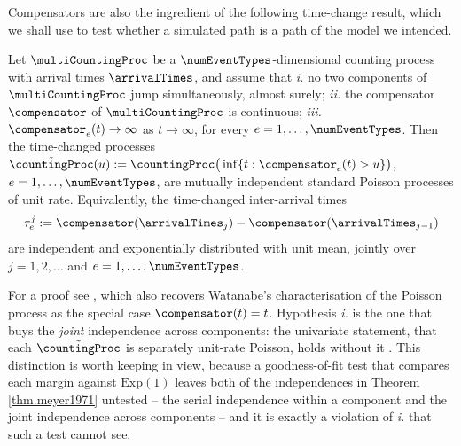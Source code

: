 Compensators are also the ingredient of the following time-change result,
which we shall use to test whether a simulated path is a path of the model we intended.

\begin{thm}\label{thm.meyer1971}
 Let $\multiCountingProc$ be a $\numEventTypes$-dimensional counting process with arrival times
 $\arrivalTimes$, and assume that
 \emph{i.} no two components of $\multiCountingProc$ jump simultaneously, almost surely;
 \emph{ii.} the compensator $\compensator$ of $\multiCountingProc$ is continuous;
 \emph{iii.} $\compensator_{e}(t) \rightarrow \infty$ as $t\rightarrow \infty$,
 for every $e = 1, \dots, \numEventTypes$.
 Then the time-changed processes
 $\tilde{\countingProc}(u) := \countingProc \big( \inf\lbrace t: \compensator_e(t) > u \rbrace \big)$,
 $e = 1, \dots, \numEventTypes$,
 are mutually independent standard Poisson processes of unit rate.
 Equivalently, the time-changed inter-arrival times
 \begin{equation}\label{eq.time-changed_intertimes}
  \tau_e^j := \compensator(\arrivalTimes_{j}) - \compensator(\arrivalTimes_{j-1})
 \end{equation}
 are independent and exponentially distributed with unit mean,
 jointly over $j = 1, 2, \dots$ and $e = 1,\dots,\numEventTypes$.
\end{thm}

For a proof see \cite{BN88sim}, which also recovers Watanabe's characterisation of the Poisson
process as the special case $\compensator(t) = t$.
Hypothesis \emph{i.} is the one that buys the \emph{joint} independence across components:
the univariate statement, that each $\tilde{\countingProc}$ is separately unit-rate Poisson,
holds without it \citep{Pap72int}.
This distinction is worth keeping in view,
because a goodness-of-fit test that compares each margin against $\text{Exp}(1)$
leaves both of the independences in Theorem \ref{thm.meyer1971} untested
-- the serial independence within a component and the joint independence across components --
and it is exactly a violation of \emph{i.} that such a test cannot see.
